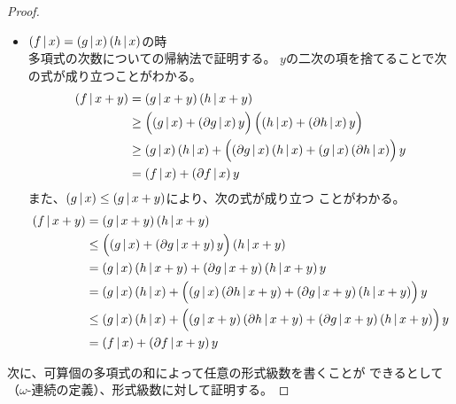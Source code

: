 {\begin{proof}
\begin{itemize}
\begin{equation*}
\begin{split}
				&= \plr{f\bou x} + \plr{\partial f\bou x + y}y \\
			\end{split}\end{equation*}
			\item $\mathinner{({f{\,|\,}x})}=\mathinner{({g{\,|\,}x})}\mathinner{({h{\,|\,}x})}$の時 \\
			多項式の次数についての帰納法で証明する。
			$y$の二次の項を捨てることで次の式が成り立つことがわかる。
			\begin{equation*}\begin{split}
				\mathinner{({f{\,|\,}x + y})} &= \mathinner{({g{\,|\,}x + y})}\mathinner{({h{\,|\,}x + y})} \\
				&\ge \mathinner{\Bigl({\mathinner{({g{\,|\,}x})} + \mathinner{({\partial g{\,|\,}x})}y}\Bigr)}
					\mathinner{\Bigl({\mathinner{({h{\,|\,}x})} + \mathinner{({\partial h{\,|\,}x})}y}\Bigr)} \\
				&\ge \mathinner{({g{\,|\,}x})}\mathinner{({h{\,|\,}x})}
					+ \mathinner{\Bigl({\mathinner{({\partial g{\,|\,}x})}\mathinner{({h{\,|\,}x})} 
					+ \mathinner{({g{\,|\,}x})}\mathinner{({\partial h{\,|\,}x})}}\Bigr)}y \\
				&= \mathinner{({f{\,|\,}x})} + \mathinner{({\partial f{\,|\,}x})}y
			\end{split}\end{equation*}
			また、$\mathinner{({g{\,|\,}x})}\le\mathinner{({g{\,|\,}x + y})}$により、次の式が成り立つ
			ことがわかる。
			\begin{equation*}\begin{split}
				\mathinner{({f{\,|\,}x + y})} &= \mathinner{({g{\,|\,}x + y})}\mathinner{({h{\,|\,}x + y})} \\
				&\le \mathinner{\Bigl({\mathinner{({g{\,|\,}x})} + \mathinner{({\partial g{\,|\,}x + y})}y}\Bigr)}
					\mathinner{({h{\,|\,}x + y})} \\
				&= \mathinner{({g{\,|\,}x})}\mathinner{({h{\,|\,}x + y})} 
					+ \mathinner{({\partial g{\,|\,}x + y})}\mathinner{({h{\,|\,}x + y})}y \\
				&= \mathinner{({g{\,|\,}x})}\mathinner{({h{\,|\,}x})} + \mathinner{\Bigl({
					\mathinner{({g{\,|\,}x})}\mathinner{({\partial h{\,|\,}x + y})}
					+ \mathinner{({\partial g{\,|\,}x + y})}\mathinner{({h{\,|\,}x + y})}}\Bigr)}y \\
				&\le \mathinner{({g{\,|\,}x})}\mathinner{({h{\,|\,}x})} + \mathinner{\Bigl({
					\mathinner{({g{\,|\,}x + y})}\mathinner{({\partial h{\,|\,}x + y})}
					+ \mathinner{({\partial g{\,|\,}x + y})}\mathinner{({h{\,|\,}x + y})}}\Bigr)}y \\
				&= \mathinner{({f{\,|\,}x})} + \mathinner{({\partial f{\,|\,}x + y})}y
			\end{split}\end{equation*}
		\end{itemize} %
		次に、可算個の多項式の和によって任意の形式級数を書くことが
		できるとして（$\omega$-連続の定義）、形式級数に対して証明する。
	\end{proof} %

}
